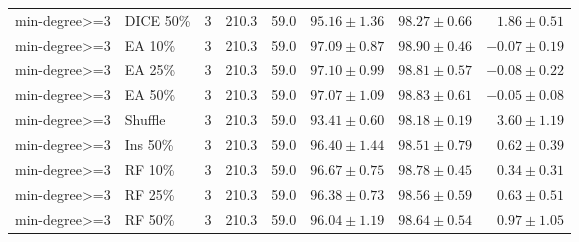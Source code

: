 {\begin{longtable}{llrrrrrr}
min-degree>=3 & DICE 50\% & 3 & 210.3 & 59.0 & $95.16\pm1.36$ & $98.27\pm0.66$ & $1.86\pm0.51$ \\
min-degree>=3 & EA 10\% & 3 & 210.3 & 59.0 & $97.09\pm0.87$ & $98.90\pm0.46$ & $-0.07\pm0.19$ \\
min-degree>=3 & EA 25\% & 3 & 210.3 & 59.0 & $97.10\pm0.99$ & $98.81\pm0.57$ & $-0.08\pm0.22$ \\
min-degree>=3 & EA 50\% & 3 & 210.3 & 59.0 & $97.07\pm1.09$ & $98.83\pm0.61$ & $-0.05\pm0.08$ \\
min-degree>=3 & Shuffle & 3 & 210.3 & 59.0 & $93.41\pm0.60$ & $98.18\pm0.19$ & $3.60\pm1.19$ \\
min-degree>=3 & Ins 50\% & 3 & 210.3 & 59.0 & $96.40\pm1.44$ & $98.51\pm0.79$ & $0.62\pm0.39$ \\
min-degree>=3 & RF 10\% & 3 & 210.3 & 59.0 & $96.67\pm0.75$ & $98.78\pm0.45$ & $0.34\pm0.31$ \\
min-degree>=3 & RF 25\% & 3 & 210.3 & 59.0 & $96.38\pm0.73$ & $98.56\pm0.59$ & $0.63\pm0.51$ \\
min-degree>=3 & RF 50\% & 3 & 210.3 & 59.0 & $96.04\pm1.19$ & $98.64\pm0.54$ & $0.97\pm1.05$ \\
\end{longtable}
}

